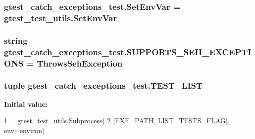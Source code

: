 \subsubsection[{Set\+Env\+Var}]{\setlength{\rightskip}{0pt plus 5cm}gtest\+\_\+catch\+\_\+exceptions\+\_\+test.\+Set\+Env\+Var = gtest\+\_\+test\+\_\+utils.\+Set\+Env\+Var}\label{namespacegtest__catch__exceptions__test_a60be14c2b88aafb689ba4d3d2578449e}
\hypertarget{namespacegtest__catch__exceptions__test_a237f68d721da53e9fd4f83b07a1887e3}{}
\subsubsection[{S\+U\+P\+P\+O\+R\+T\+S\+\_\+\+S\+E\+H\+\_\+\+E\+X\+C\+E\+P\+T\+I\+O\+N\+S}]{\setlength{\rightskip}{0pt plus 5cm}string gtest\+\_\+catch\+\_\+exceptions\+\_\+test.\+S\+U\+P\+P\+O\+R\+T\+S\+\_\+\+S\+E\+H\+\_\+\+E\+X\+C\+E\+P\+T\+I\+O\+N\+S = \textquotesingle{}Throws\+Seh\+Exception\textquotesingle{}}\label{namespacegtest__catch__exceptions__test_a237f68d721da53e9fd4f83b07a1887e3}
\hypertarget{namespacegtest__catch__exceptions__test_a47d343e41ab21971800091c7166f6129}{}
\subsubsection[{T\+E\+S\+T\+\_\+\+L\+I\+S\+T}]{\setlength{\rightskip}{0pt plus 5cm}tuple gtest\+\_\+catch\+\_\+exceptions\+\_\+test.\+T\+E\+S\+T\+\_\+\+L\+I\+S\+T}\label{namespacegtest__catch__exceptions__test_a47d343e41ab21971800091c7166f6129}
{\bfseries Initial value\+:}
\begin{DoxyCode}
1 = \hyperlink{classgtest__test__utils_1_1_subprocess}{gtest\_test\_utils.Subprocess}(
2     [EXE\_PATH, LIST\_TESTS\_FLAG], env=environ)
\end{DoxyCode}

